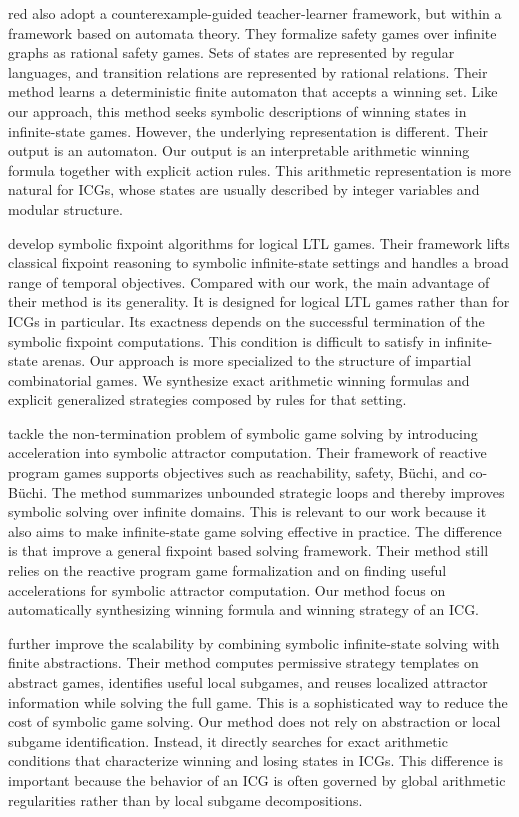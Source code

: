 \documentclass[review]{elsarticle}
\begin{document}
\begin{color}{red}
\citet{NeiT2016} also adopt a counterexample-guided teacher-learner framework, but within a framework based on automata theory.
They formalize safety games over infinite graphs as rational safety games.
Sets of states are represented by regular languages, and transition relations are represented by rational relations.
Their method learns a deterministic finite automaton that accepts a winning set.
Like our approach, this method seeks symbolic descriptions of winning states in infinite-state games.
However, the underlying representation is different.
Their output is an automaton.
Our output is an interpretable arithmetic winning formula together with explicit action rules.
This arithmetic representation is more natural for ICGs, whose states are usually described by integer variables and modular structure.

\citet{StaDK2023} develop symbolic fixpoint algorithms for logical LTL games.
Their framework lifts classical fixpoint reasoning to symbolic infinite-state settings and handles a broad range of temporal objectives.
Compared with our work, the main advantage of their method is its generality.
It is designed for logical LTL games rather than for ICGs in particular.
Its exactness depends on the successful termination of the symbolic fixpoint computations.
This condition is difficult to satisfy in infinite-state arenas.
Our approach is more specialized to the structure of impartial combinatorial games.
We synthesize exact arithmetic winning formulas and explicit generalized strategies composed by rules for that setting.

\citet{HeiR2024} tackle the non-termination problem of symbolic game solving by introducing acceleration into symbolic attractor computation.
Their framework of reactive program games supports objectives such as reachability, safety, B\"uchi, and co-B\"uchi.
The method summarizes unbounded strategic loops and thereby improves symbolic solving over infinite domains.
This is relevant to our work because it also aims to make infinite-state game solving effective in practice.
The difference is that \citet{HeiR2024} improve a general fixpoint based solving framework.
Their method still relies on the reactive program game formalization and on finding useful accelerations for symbolic attractor computation.
Our method focus on automatically synthesizing winning formula and winning strategy of an ICG.

\citet{SchHDN2024} further improve the scalability by combining symbolic infinite-state solving with finite abstractions.
Their method computes permissive strategy templates on abstract games, identifies useful local subgames, and reuses localized attractor information while solving the full game.
This is a sophisticated way to reduce the cost of symbolic game solving.
Our method does not rely on abstraction or local subgame identification.
Instead, it directly searches for exact arithmetic conditions that characterize winning and losing states in ICGs.
This difference is important because the behavior of an ICG is often governed by global arithmetic regularities rather than by local subgame decompositions.


\end{color}
\end{document}

